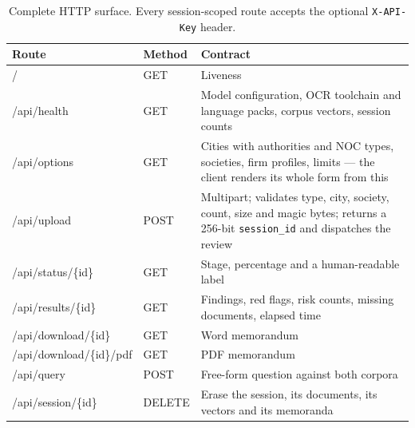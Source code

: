 \documentclass[11pt,a4paper]{article}
\newcommand{\code}[1]{\texttt{\small #1}}
\begin{document}
\begin{table}[H]
\centering\scriptsize
\begin{tabularx}{\linewidth}{@{}>{\ttfamily}L{3.9cm} l X@{}}
\toprule
{}\normalfont\textbf{Route} & \textbf{Method} & \textbf{Contract} \\
\midrule
/                        & GET    & Liveness \\
/api/health              & GET    & Model configuration, OCR toolchain and language packs, corpus vectors, session counts \\
/api/options             & GET    & Cities with authorities and NOC types, societies, firm profiles, limits --- the client renders its whole form from this \\
/api/upload              & POST   & Multipart; validates type, city, society, count, size and magic bytes; returns a 256-bit \code{session\_id} and dispatches the review \\
/api/status/\{id\}       & GET    & Stage, percentage and a human-readable label \\
/api/results/\{id\}      & GET    & Findings, red flags, risk counts, missing documents, elapsed time \\
/api/download/\{id\}     & GET    & Word memorandum \\
/api/download/\{id\}/pdf & GET    & PDF memorandum \\
/api/query               & POST   & Free-form question against both corpora \\
/api/session/\{id\}      & DELETE & Erase the session, its documents, its vectors and its memoranda \\
\bottomrule
\end{tabularx}
\caption{Complete HTTP surface. Every session-scoped route accepts the optional
\code{X-API-Key} header.}
\end{table}
\end{document}
